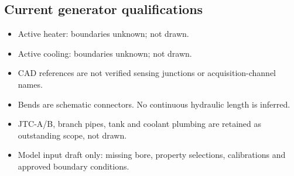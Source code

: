 \documentclass[11pt]{article}
\begin{document}
\subsection*{Current generator qualifications}
\begin{itemize}
\item Active heater: boundaries unknown; not drawn.
\item Active cooling: boundaries unknown; not drawn.
\item CAD references are not verified sensing junctions or acquisition-channel names.
\item Bends are schematic connectors. No continuous hydraulic length is inferred.
\item JTC-A/B, branch pipes, tank and coolant plumbing are retained as outstanding scope, not drawn.
\item Model input draft only: missing bore, property selections, calibrations and approved boundary conditions.
\end{itemize}
\clearpage
\end{document}
